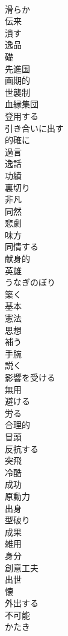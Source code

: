 \documentclass[8pt]{extreport}
\begin{document}
\begin{CJK}{UTF8}{min}
\\	滑らか
\\	伝来
\\	潰す
\\	逸品
\\	礎
\\	先進国
\\	画期的
\\	世襲制
\\	血縁集団
\\	登用する
\\	引き合いに出す
\\	的確に
\\	過言
\\	逸話
\\	功績
\\	裏切り
\\	非凡
\\	同然
\\	悲劇
\\	味方
\\	同情する
\\	献身的
\\	英雄
\\	うなぎのぼり
\\	築く
\\	基本
\\	憲法
\\	思想
\\	補う
\\	手腕
\\	説く
\\	影響を受ける
\\	無用
\\	避ける
\\	労る
\\	合理的
\\	冒頭
\\	反抗する
\\	突飛
\\	冷酷
\\	成功
\\	原動力
\\	出身
\\	型破り
\\	成果
\\	雑用
\\	身分
\\	創意工夫
\\	出世
\\	懐
\\	外出する
\\	不可能
\\	かたき

\end{CJK}
\end{document}
